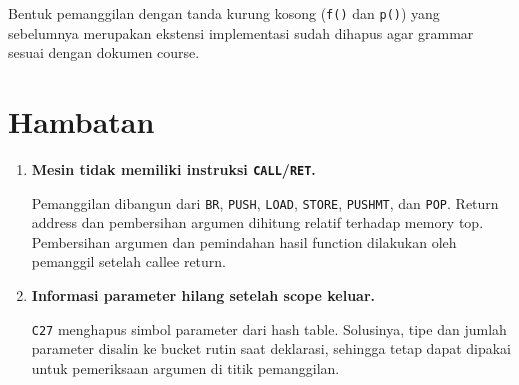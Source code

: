 \documentclass[11pt,a4paper]{article}
\begin{document}
Bentuk pemanggilan dengan tanda kurung kosong (\texttt{f()} dan
\texttt{p()}) yang sebelumnya merupakan ekstensi implementasi sudah
dihapus agar grammar sesuai dengan dokumen course.

\section{Hambatan}

\begin{enumerate}
%

%

%

  \item \textbf{Mesin tidak memiliki instruksi \texttt{CALL}/\texttt{RET}.}

        Pemanggilan dibangun dari \texttt{BR}, \texttt{PUSH},
        \texttt{LOAD}, \texttt{STORE}, \texttt{PUSHMT}, dan
        \texttt{POP}. Return address dan pembersihan argumen dihitung
        relatif terhadap memory top. Pembersihan argumen dan pemindahan
        hasil function dilakukan oleh pemanggil setelah callee return.

  \item \textbf{Informasi parameter hilang setelah scope keluar.}

        \texttt{C27} menghapus simbol parameter dari hash table.
        Solusinya, tipe dan jumlah parameter disalin ke bucket rutin
        saat deklarasi, sehingga tetap dapat dipakai untuk pemeriksaan
        argumen di titik pemanggilan.


\end{enumerate}
\end{document}

